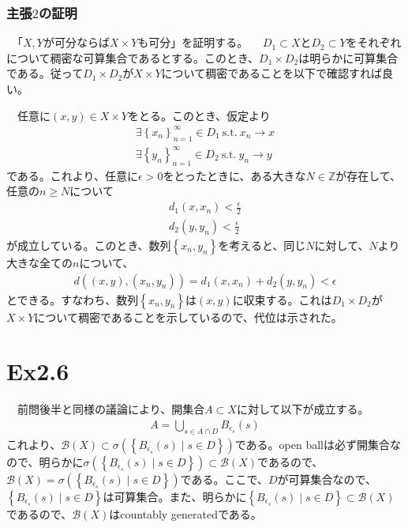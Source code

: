 \documentclass{article}
\begin{document}
\subsubsection{主張$2$の証明}
　「$X,Y$が可分ならば$X\times Y$も可分」を証明する。
　$D_1 \subset X$と$D_2\subset Y$をそれぞれについて稠密な可算集合であるとする。このとき、$D_1\times D_2$は明らかに可算集合である。従って$D_1\times D_2$が$X\times Y$について稠密であることを以下で確認すれば良い。

　任意に$(x, y)\in X\times Y$をとる。このとき、仮定より
\begin{align*}
	\exists \left\{ x_n \right\}_{n = 1}^{\infty} \in D_1\ \text{s.t.}\ x_n \to x\\
	\exists \left\{ y_n \right\}_{n = 1}^{\infty} \in D_2\ \text{s.t.}\ y_n \to y
\end{align*}
である。これより、任意に$\epsilon > 0$をとったときに、ある大きな$N \in \mathbb{Z}$が存在して、任意の$n \geq N$について
\begin{align*}
	d_1(x,x_n) < \frac{\epsilon}{2}\\
	d_2(y,y_n) < \frac{\epsilon}{2}
\end{align*}
が成立している。このとき、数列$\left\{ x_n, y_n \right\}$を考えると、同じ$N$に対して、$N$より大きな全ての$n$について、
\begin{align*}
	d((x, y), (x_n,y_n)) = d_1(x, x_n) + d_2(y, y_n) < \epsilon
\end{align*}
とできる。すなわち、数列$\left\{ x_n, y_n \right\}$は$(x,y)$に収束する。これは$D_1\times D_2$が$X\times Y$について稠密であることを示しているので、代位は示された。

\section{Ex2.6}
　前問後半と同様の議論により、開集合$A\subset X$に対して以下が成立する。
\begin{align*}
	A = \bigcup_{s\in A\cap D} B_{\epsilon_s}(s)
\end{align*}
これより、$\mathcal{B}(X)\subset \sigma\left( \left\{ B_{\epsilon_s}(s)\mid s\in D \right\} \right)$である。open ballは必ず開集合なので、明らかに$\sigma\left( \left\{ B_{\epsilon_s}(s)\mid s\in D \right\} \right) \subset \mathcal{B}(X)$であるので、$\mathcal{B}(X) = \sigma\left( \left\{ B_{\epsilon_s}(s)\mid s\in D \right\} \right)$である。ここで、$D$が可算集合なので、$\left\{ B_{\epsilon_s}(s)\mid s\in D \right\}$は可算集合。また、明らかに$\left\{ B_{\epsilon_s}(s)\mid s\in D \right\} \subset \mathcal{B}(X)$であるので、$\mathcal{B}(X)$はcountably generatedである。
\end{document}
